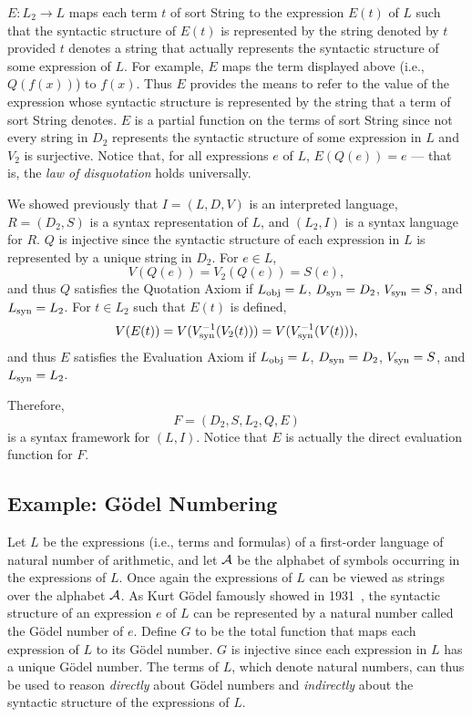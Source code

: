 \documentclass[11pt,fleqn]{article}
\newcommand{\sA}{\mbox{$\cal A$}}
\newcommand{\mname}[1]{\mbox{\sf #1}}
\newcommand{\tarrow}{\rightarrow}
\begin{document}
$E : L_2 \tarrow L$ maps each term $t$ of sort \mname{String} to the
expression $E(t)$ of $L$ such that the syntactic structure of $E(t)$
is represented by the string denoted by $t$ provided $t$ denotes a
string that actually represents the syntactic structure of some
expression of $L$.  For example, $E$ maps the term displayed above
(i.e., $Q(f(x))$) to $f(x)$.  Thus $E$ provides the means to refer to
the value of the expression whose syntactic structure is represented
by the string that a term of sort \mname{String} denotes.  $E$ is a
partial function on the terms of sort \mname{String} since not every
string in $D_2$ represents the syntactic structure of some expression
in $L$ and $V_2$ is surjective.  Notice that, for all expressions $e$
of $L$, $E(Q(e)) = e$ --- that is, the \emph{law of disquotation}
holds universally.

We showed previously that $I = (L, D, V)$ is an interpreted language,
$R= (D_2,S)$ is a syntax representation of $L$, and $(L_2,I)$ is a
syntax language for $R$.  $Q$ is injective since the syntactic
structure of each expression in $L$ is represented by a unique string
in $D_2$.  For $e \in L$, \[V(Q(e)) = V_2(Q(e)) = S(e),\] and thus $Q$
satisfies the Quotation Axiom if $L_{\rm obj} = L$, $D_{\rm syn} =
D_2$, $V_{\rm syn} = S$, and $L_{\rm syn} = L_2$.  For $t \in L_2$
such that $E(t)$ is defined,
\[V(E(t)) = V(V^{-1}_{\rm syn}(V_2(t))) = V(V^{-1}_{\rm syn}(V(t))),\] 
and thus $E$ satisfies the Evaluation Axiom if $L_{\rm obj} = L$,
$D_{\rm syn} = D_2$, $V_{\rm syn} = S$, and $L_{\rm syn} = L_2$.

Therefore, \[F = (D_2,S,L_2,Q,E)\] is a syntax framework for
$(L,I)$. Notice that $E$ is actually the direct evaluation function
for $F$.

\subsection{Example: G\"odel Numbering} \label{subsec:goedel}

Let $L$ be the expressions (i.e., terms and formulas) of a first-order
language of natural number of arithmetic, and let $\sA$ be the
alphabet of symbols occurring in the expressions of $L$.  Once again
the expressions of $L$ can be viewed as strings over the alphabet
$\sA$.  As Kurt G\"odel famously showed in 1931~\cite{Goedel31}, the
syntactic structure of an expression $e$ of $L$ can be represented by
a natural number called the G\"odel number of $e$.  Define $G$ to be
the total function that maps each expression of $L$ to its G\"odel
number.  $G$ is injective since each expression in $L$ has a unique
G\"odel number.  The terms of $L$, which denote natural numbers, can
thus be used to reason \emph{directly} about G\"odel numbers and
\emph{indirectly} about the syntactic structure of the expressions of
$L$.
\end{document}
